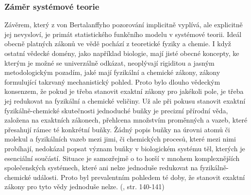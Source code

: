 \documentclass[11pt,a4paper]{article}
\begin{document}
\subsubsection{Záměr systémové teorie}

Závěrem, který z von Bertalanffyho pozorování implicitně vyplívá, ale explicitně jej nevysloví, je primát statistického funkčního modelu v systémové teorii. Ideál obecně platných zákonů ve vědě pochází z teoretické fyziky a chemie. I když ostatní vědecké domény, jako například biologie, mají jisté obecné koncepty, ke kterým je možné se univerzálně odkázat, neoplývají rigiditou a jasným metodologickým pozadím, jaké mají fyzikální a chemické zákony, zákony formulující takzvaný mechanistický pohled. Proto bylo dlouho vědeckým konsenzem, že pokud je třeba stanovit exaktní zákony pro jakékoli pole, je třeba jej redukovat na fyzikální a chemické veličiny. Už ale při pokusu stanovit exaktní fyzikálně-chemické skutečnosti jednoduché buňky je precizní přírodní věda, založena na exaktních zákonech, přehlcena množstvím proměnných a vazeb, které přesahují rámec té konkrétní buňky. Žádný popis buňky na úrovni atomů či molekul a fyzikálních vazeb mezi jimi, či chemických procesů, které mezi nimi probíhají, nedokázal popsat význam buňky v biologickém systému těl, kterých je esenciální součástí. Situace je samozřejmě o to horší v mnohem komplexnějších společenských systémech, které ani nelze jednoduše redukovat na fyzikálně-chemické události. Proto byl prevalentním pohledem té doby, že stanovit exaktní zákony pro tyto vědy jednoduše nelze. (\cite{von_bertalanffy_outline_1950}, str. 140-141)
\end{document}
